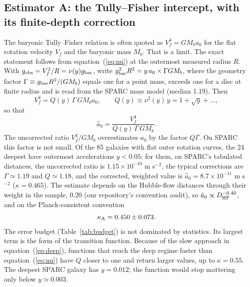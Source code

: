\documentclass[fleqn,usenatbib]{mnras}
\begin{document}
\subsection{Estimator A: the Tully--Fisher intercept, with its finite-depth correction}
\label{sec:btfr}
The baryonic Tully--Fisher relation is often quoted as $V_f^4=GM_ba_0$ for the flat rotation velocity $V_f$ and the baryonic mass $M_b$. That is a limit. The exact statement follows from equation~(\ref{eq:nu}) at the outermost measured radius $R$. With $g_{\rm obs}=V_f^2/R=\nu(y)g_{\rm bar}$, write $g_{\rm bar}^2R^2=y\,a_0\times\Gamma GM_b$, where the geometry factor $\Gamma\equiv g_{\rm bar}R^2/(GM_b)$ equals one for a point mass, exceeds one for a disc at finite radius and is read from the SPARC mass model (median 1.19). Then
\begin{equation}
V_f^4=Q(y)\,\Gamma\,GM_ba_0,\qquad Q(y)\equiv\nu^2(y)\,y=1+\sqrt y+\ldots,
\label{eq:btfr}
\end{equation}
so that
\begin{equation}
\hat a_0=\frac{V_f^4}{Q(y)\,\Gamma\,GM_b} .
\label{eq:btfrest}
\end{equation}
The uncorrected ratio $V_f^4/GM_b$ overestimates $a_0$ by the factor $Q\Gamma$. On SPARC this factor is not small. Of the 85 galaxies with flat outer rotation curves, the 24 deepest have outermost accelerations $y<0.05$; for them, on SPARC's tabulated distances, the uncorrected ratio is $1.15\times10^{-10}$ m s$^{-2}$, the typical corrections are $\Gamma\simeq1.19$ and $Q\simeq1.18$, and the corrected, weighted value is $\hat a_0=8.7\times10^{-11}$ m s$^{-2}$ ($\kappa=0.465$). The estimate depends on the Hubble-flow distances through their weight in the sample, 0.20 (our repository's convention audit), so $\hat a_0\propto D_{\rm HF}^{-0.40}$, and on the Planck-consistent convention
\begin{equation}
\kappa_{\rm A}=0.450\pm0.073 .
\label{eq:kappaA}
\end{equation}
The error budget (Table~\ref{tab:budget}) is not dominated by statistics. Its largest term is the form of the transition function. Because of the slow approach in equation~(\ref{eq:deep}), functions that reach the deep regime faster than equation~(\ref{eq:nu}) have $Q$ closer to one and return larger values, up to $\kappa=0.55$. The deepest SPARC galaxy has $y=0.012$; the function would stop mattering only below $y\simeq0.003$.
\end{document}
